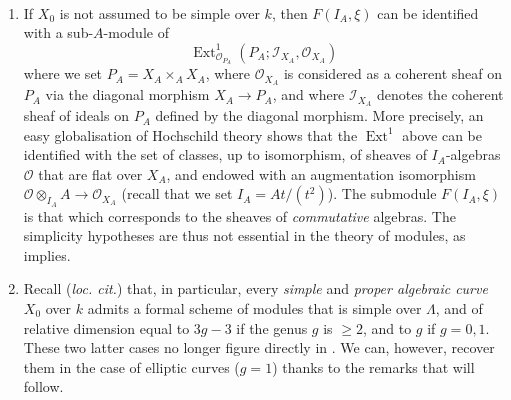 \begin{remark}\label{fga3.ii-c.4-remarks}
    ~
    \begin{enumerate}
        \item If $X_0$ is not assumed to be simple over $k$, then $F(I_A,\xi)$ can be identified with a sub-$A$-module of
              \[
                  \operatorname{Ext}_{\mathcal{O}_{P_A}}^1(P_A;\mathcal{I}_{X_A},\mathcal{O}_{X_A})
              \]
              where we set $P_A=X_A\times_A X_A$, where $\mathcal{O}_{X_A}$ is considered as a coherent sheaf on $P_A$ via the diagonal morphism $X_A\to P_A$, and where $\mathcal{I}_{X_A}$ denotes the coherent sheaf of ideals on $P_A$ defined by the diagonal morphism.
              More precisely, an easy globalisation of Hochschild theory shows that the $\operatorname{Ext}^1$ above can be identified with the set of classes, up to isomorphism, of sheaves of $I_A$-algebras $\mathcal{O}$ that are flat over $X_A$, and endowed with an augmentation isomorphism $\mathcal{O}\otimes_{I_A}A\to\mathcal{O}_{X_A}$ (recall that we set $I_A=At/(t^2)$).
              The submodule $F(I_A,\xi)$ is that which corresponds to the sheaves of \emph{commutative} algebras.
              The simplicity hypotheses are thus not essential in the theory of modules, as  implies.
        \item Recall (\emph{loc. cit.}) that, in particular, every \emph{simple} and \emph{proper algebraic curve} $X_0$ over $k$ admits a formal scheme of modules that is simple over $\Lambda$, and of relative dimension equal to $3g-3$ if the genus $g$ is $\geqslant2$, and to $g$ if $g=0,1$.
              These two latter cases no longer figure directly in .
              We can, however, recover them in the case of elliptic curves ($g=1$) thanks to the remarks that will follow.
    \end{enumerate}
\end{remark}


